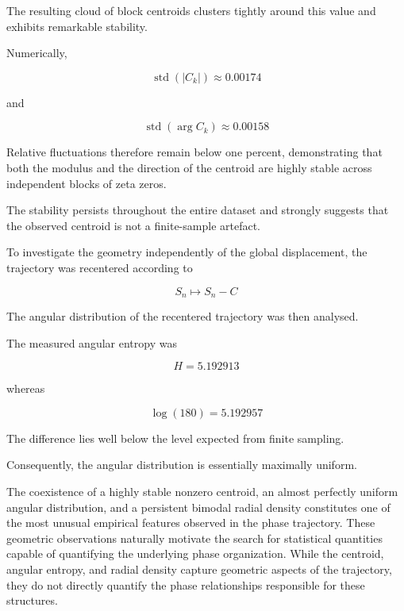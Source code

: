 \documentclass[11pt]{amsart}
\theoremstyle{definition}
\theoremstyle{remark}
\begin{document}
The resulting cloud of block centroids clusters tightly
around this value and exhibits remarkable stability.

Numerically,

\begin{equation}
\operatorname{std}(|C_k|)
\approx
0.00174
\label{eq:stdmod}
\end{equation}

and

\begin{equation}
\operatorname{std}(\arg C_k)
\approx
0.00158
\label{eq:stdarg}
\end{equation}

Relative fluctuations therefore remain below one percent,
demonstrating that both the modulus and the direction of
the centroid are highly stable across independent blocks
of zeta zeros.

The stability persists throughout the entire dataset and
strongly suggests that the observed centroid is not a
finite-sample artefact.

To investigate the geometry independently of the global
displacement, the trajectory was recentered according to

\begin{equation}
S_n
\mapsto
S_n-C
\label{eq:recenter}
\end{equation}

The angular distribution of the recentered trajectory was
then analysed.

The measured angular entropy was

\begin{equation}
H
=
5.192913
\label{eq:H}
\end{equation}

whereas

\begin{equation}
\log(180)
=
5.192957
\label{eq:Hmax}
\end{equation}

The difference lies well below the level expected from
finite sampling.

Consequently, the angular distribution is essentially
maximally uniform.

The coexistence of a highly stable nonzero centroid, an
almost perfectly uniform angular distribution, and a
persistent bimodal radial density constitutes one of the
most unusual empirical features observed in the phase
trajectory.
These geometric observations naturally motivate the search
for statistical quantities capable of quantifying the
underlying phase organization.
While the centroid, angular entropy, and radial density
capture geometric aspects of the trajectory, they do not
directly quantify the phase relationships responsible for
these structures.
\end{document}
